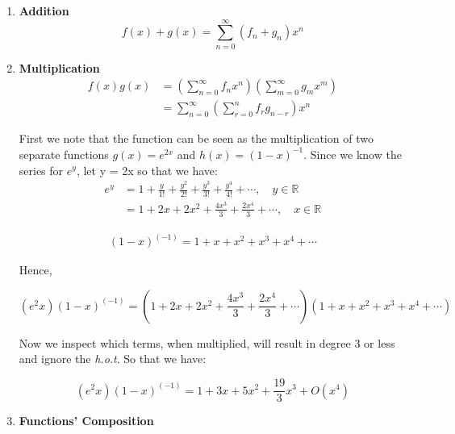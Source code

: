 \documentclass[english,course]{Notes}
\newcommand{\ita}[1]{\textit{#1}}
\begin{document}
\begin{enumerate}

	\item \textbf{Addition}
		$$f(x) + g(x) = \sum_{n=0}^{\infty}(f_n+ g_n) x^n$$
	
	\item \textbf{Multiplication}
		$$\begin{aligned} f ( x ) g ( x ) & = \left( \sum _ { n = 0 } ^ { \infty } f _ { n } x ^ { n } \right) \left( \sum _ { m = 0 } ^ { \infty } g _ { m } x ^ { m } \right) \\ & = \sum _ { n = 0 } ^ { \infty } \left( \sum _ { r = 0 } ^ { n } f _ { r } g _ { n - r } \right) x ^ { n } \end{aligned}$$
		
		
		\par{First we note that the function can be seen as the multiplication of two separate functions $g(x) = e^{2x}$ and $h(x) = (1-x)^{-1}$. Since we know the series for $e^y$, let y = 2x so that we have:}
		\begin{align*}
		e^ y &= 1 + \frac { y } { 1 ! } + \frac { y ^ { 2 } } { 2 ! } + \frac { y ^ { 3 } } { 3 ! } + \frac { y ^ { 4 } } { 4 ! } + \cdots , \quad y \in \mathbb { R } \\
	& = 1 + 2 x + 2 x ^ { 2 } + \frac { 4 x ^ { 3 } } { 3 } + \frac { 2 x ^ { 4 } } { 3 } + \cdots , \quad x \in \mathbb { R }
	\end{align*}
			
	\begin{align*}(1-x)^{(-1)} = 1 + x + x^2 + x^3 + x^4 + \cdots\end{align*}
	
	\par{Hence,}
	
	$$(e^2x) (1-x)^{(-1)} = (1 + 2 x + 2 x ^ { 2 } + \frac { 4 x ^ { 3 } } { 3 } + \frac { 2 x ^ { 4 } } { 3 } + \cdots) (1 + x + x^2 + x^3 + x^4 + \cdots) $$
	
	\par{Now we inspect which terms, when multiplied, will result in degree 3 or less and ignore the \ita{h.o.t}. So that we have:}
	
	$$ (e^2x) (1-x)^{(-1)} = 1 + 3 x + 5 x ^ { 2 } + \frac { 19 } { 3 } x ^ { 3 } + O(x^4) $$
	
	\item \textbf{Functions' Composition}
	

\end{enumerate}
\end{document}
